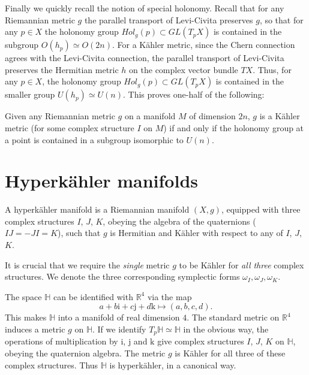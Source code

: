 \documentclass[12pt,letterpaper,reqno]{amsart}
\numberwithin{equation}{section}
\newcommand{\R}{\ensuremath{\mathbb R}}
\newcommand{\bbH}{\ensuremath{\mathbb H}}
\newcommand{\kahler}{K\"ahler\xspace}
\newcommand{\hk}{hyperk\"ahler\xspace}
\newcommand{\I}{{\mathrm i}}
\newcommand{\J}{{\mathrm j}}
\newcommand{\K}{{\mathrm k}}
\newcommand{\ti}[1]{\textit{#1}}
\begin{document}
Finally we quickly recall the notion of special holonomy. Recall that for any Riemannian metric $g$ the parallel transport of Levi-Civita preserves $g$, so that 
for any $p \in X$ the holonomy group $Hol_g(p) \subset GL(T_p X)$ 
is contained in the subgroup $O(h_p) \simeq O(2n)$.
For a \kahler metric, since the Chern connection agrees with the 
Levi-Civita connection, the parallel transport of Levi-Civita preserves the Hermitian metric
$h$ on the complex vector bundle $TX$. Thus, for any $p \in X$, the holonomy group
$Hol_g(p) \subset GL(T_p X)$ is contained in the smaller group $U(h_p) \simeq U(n)$.
This proves one-half of the following:

\begin{prop} Given any Riemannian metric $g$ on a manifold $M$ of dimension $2n$, $g$ is a \kahler metric 
(for some complex structure $I$ on $M$) if and only if
the holonomy group at a point is contained in
a subgroup isomorphic to $U(n)$.
\end{prop}


\section{Hyperk\"ahler manifolds}

\begin{defn} A \hk manifold is a Riemannian 
manifold $(X,g)$,
equipped with three complex structures $I$, $J$, $K$, obeying the algebra of the quaternions ($IJ = -JI = K$),
such that $g$ is Hermitian and \kahler with respect to
any of $I$, $J$, $K$.
\end{defn}

It is crucial that we require the \ti{single} metric
$g$ to be \kahler for \ti{all three} complex structures.
We denote the three corresponding
symplectic forms $\omega_I, \omega_J, \omega_K$.

\begin{example} The space
$\bbH$ can be identified with $\R^4$
via the map
\begin{equation}
  a + b \I + c \J + d \K \mapsto (a,b,c,d).
\end{equation}
This makes $\bbH$ into a manifold of real 
dimension $4$.
The standard metric on $\R^4$ induces a metric
$g$ on $\bbH$.
If we identify $T_p \bbH \simeq \bbH$ 
in the obvious way,
the operations of multiplication by $\I$, $\J$ and $\K$
give complex structures $I$, $J$, $K$ on $\bbH$,
obeying the quaternion algebra.
The metric $g$ is \kahler for all three of these complex
structures. Thus $\bbH$ is \hk, in a canonical way.
\end{example}
\end{document}
